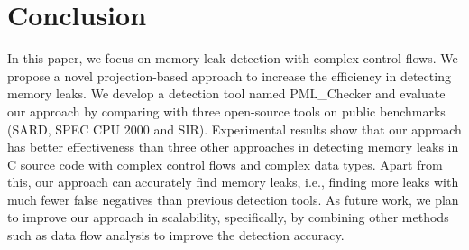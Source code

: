 \section{Conclusion}\label{sec:conclusion}

In this paper, we focus on memory leak detection with complex control flows. We propose a novel projection-based approach to increase the efficiency in detecting memory leaks. We develop a detection tool named PML\_Checker and evaluate our approach by comparing with three open-source tools on public benchmarks (SARD, SPEC CPU $2000$ and SIR). Experimental results show that our approach has better effectiveness than three other approaches in detecting memory leaks in C source code with complex control flows and complex data types. Apart from this, our approach can accurately find memory leaks, i.e., finding more leaks with much fewer false negatives than previous detection tools. As future work, we plan to improve our approach in scalability, specifically, by combining other methods such as data flow analysis to improve the detection accuracy.
